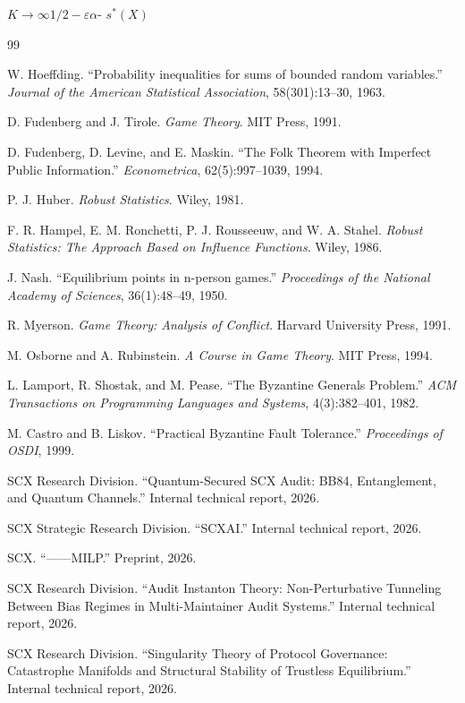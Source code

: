 \documentclass[12pt,a4paper]{article}
\theoremstyle{remark}
\begin{document}
\noindent\textbf{}
$K \to \infty$$1/2 - \varepsilon$$\alpha$-
$s^*(X)$

\newpage

\begin{thebibliography}{99}

W. Hoeffding.
``Probability inequalities for sums of bounded random variables.''
\textit{Journal of the American Statistical Association}, 58(301):13--30, 1963.

D. Fudenberg and J. Tirole.
\textit{Game Theory}. MIT Press, 1991.

D. Fudenberg, D. Levine, and E. Maskin.
``The Folk Theorem with Imperfect Public Information.''
\textit{Econometrica}, 62(5):997--1039, 1994.

P. J. Huber.
\textit{Robust Statistics}. Wiley, 1981.

F. R. Hampel, E. M. Ronchetti, P. J. Rousseeuw, and W. A. Stahel.
\textit{Robust Statistics: The Approach Based on Influence Functions}. Wiley, 1986.

J. Nash.
``Equilibrium points in n-person games.''
\textit{Proceedings of the National Academy of Sciences}, 36(1):48--49, 1950.

R. Myerson.
\textit{Game Theory: Analysis of Conflict}. Harvard University Press, 1991.

M. Osborne and A. Rubinstein.
\textit{A Course in Game Theory}. MIT Press, 1994.

L. Lamport, R. Shostak, and M. Pease.
``The Byzantine Generals Problem.''
\textit{ACM Transactions on Programming Languages and Systems}, 4(3):382--401, 1982.

M. Castro and B. Liskov.
``Practical Byzantine Fault Tolerance.''
\textit{Proceedings of OSDI}, 1999.

SCX Research Division.
``Quantum-Secured SCX Audit: BB84, Entanglement, and Quantum Channels.''
Internal technical report, 2026.

SCX Strategic Research Division.
``SCXAI.''
Internal technical report, 2026.

SCX.
``——MILP.''
Preprint, 2026.

SCX Research Division.
``Audit Instanton Theory: Non-Perturbative Tunneling Between Bias Regimes in Multi-Maintainer Audit Systems.''
Internal technical report, 2026.

SCX Research Division.
``Singularity Theory of Protocol Governance: Catastrophe Manifolds and Structural Stability of Trustless Equilibrium.''
Internal technical report, 2026.

\end{thebibliography}
\end{document}
